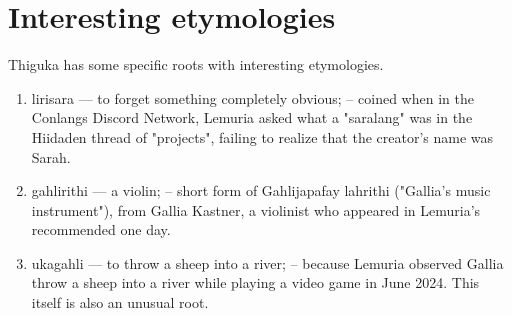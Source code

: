 \section{Interesting etymologies}
Thiguka has some specific roots with interesting etymologies.

\begin{multicols}{2} 
    \begin{enumerate}
        \item lirisara --- to forget something completely obvious; -- coined when in the Conlangs Discord Network, Lemuria asked what a "saralang" was in the Hiidaden thread of "projects", failing to realize that the creator's name was Sarah.
        \item gahlirithi --- a violin; -- short form of Gahlijapafay lahrithi ("Gallia's music instrument"), from Gallia Kastner, a violinist who appeared in Lemuria's recommended one day.
        \item ukagahli --- to throw a sheep into a river; -- because Lemuria observed Gallia throw a sheep into a river while playing a video game in June 2024. This itself is also an unusual root.
    \end{enumerate}
\end{multicols}
